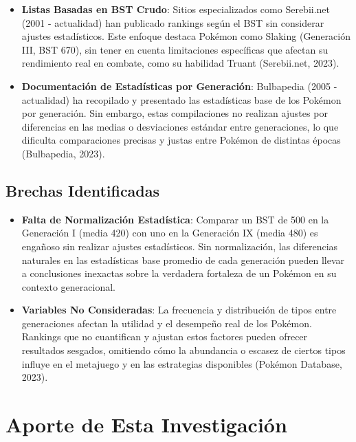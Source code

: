 \documentclass[
]{article}
\providecommand{\tightlist}{%
  \setlength{\itemsep}{0pt}\setlength{\parskip}{0pt}}
\begin{document}
\begin{itemize}
\tightlist
\item
  \textbf{Listas Basadas en BST Crudo}: Sitios especializados como
  Serebii.net (2001 - actualidad) han publicado rankings según el BST
  sin considerar ajustes estadísticos. Este enfoque destaca Pokémon como
  Slaking (Generación III, BST 670), sin tener en cuenta limitaciones
  específicas que afectan su rendimiento real en combate, como su
  habilidad Truant (Serebii.net, 2023).
\item
  \textbf{Documentación de Estadísticas por Generación}: Bulbapedia
  (2005 - actualidad) ha recopilado y presentado las estadísticas base
  de los Pokémon por generación. Sin embargo, estas compilaciones no
  realizan ajustes por diferencias en las medias o desviaciones estándar
  entre generaciones, lo que dificulta comparaciones precisas y justas
  entre Pokémon de distintas épocas (Bulbapedia, 2023).
\end{itemize}

\subsection{Brechas Identificadas}\label{brechas-identificadas}

\begin{itemize}
\tightlist
\item
  \textbf{Falta de Normalización Estadística}: Comparar un BST de 500 en
  la Generación I (media 420) con uno en la Generación IX (media 480) es
  engañoso sin realizar ajustes estadísticos. Sin normalización, las
  diferencias naturales en las estadísticas base promedio de cada
  generación pueden llevar a conclusiones inexactas sobre la verdadera
  fortaleza de un Pokémon en su contexto generacional.
\item
  \textbf{Variables No Consideradas}: La frecuencia y distribución de
  tipos entre generaciones afectan la utilidad y el desempeño real de
  los Pokémon. Rankings que no cuantifican y ajustan estos factores
  pueden ofrecer resultados sesgados, omitiendo cómo la abundancia o
  escasez de ciertos tipos influye en el metajuego y en las estrategias
  disponibles (Pokémon Database, 2023).
\end{itemize}

\section{Aporte de Esta
Investigación}\label{aporte-de-esta-investigaciuxf3n}
\end{document}
